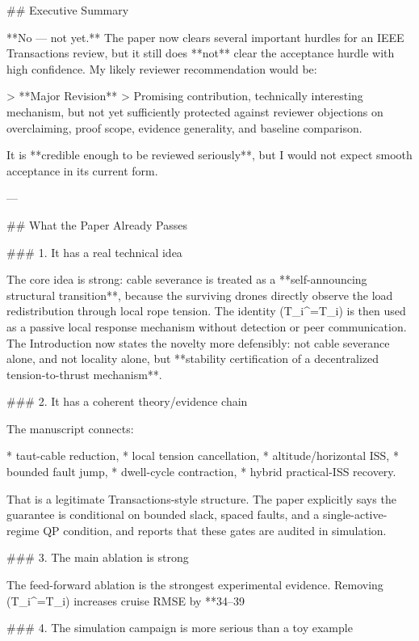 ## Executive Summary

**No — not yet.** The paper now clears several important hurdles for an IEEE Transactions review, but it still does **not** clear the acceptance hurdle with high confidence. My likely reviewer recommendation would be:

> **Major Revision**
> Promising contribution, technically interesting mechanism, but not yet sufficiently protected against reviewer objections on overclaiming, proof scope, evidence generality, and baseline comparison.

It is **credible enough to be reviewed seriously**, but I would not expect smooth acceptance in its current form.

---

## What the Paper Already Passes

### 1. It has a real technical idea

The core idea is strong: cable severance is treated as a **self-announcing structural transition**, because the surviving drones directly observe the load redistribution through local rope tension. The identity (T_i^{}=T_i) is then used as a passive local response mechanism without detection or peer communication. The Introduction now states the novelty more defensibly: not cable severance alone, and not locality alone, but **stability certification of a decentralized tension-to-thrust mechanism**.

### 2. It has a coherent theory/evidence chain

The manuscript connects:

* taut-cable reduction,
* local tension cancellation,
* altitude/horizontal ISS,
* bounded fault jump,
* dwell-cycle contraction,
* hybrid practical-ISS recovery.

That is a legitimate Transactions-style structure. The paper explicitly says the guarantee is conditional on bounded slack, spaced faults, and a single-active-regime QP condition, and reports that these gates are audited in simulation.

### 3. The main ablation is strong

The feed-forward ablation is the strongest experimental evidence. Removing (T_i^{}=T_i) increases cruise RMSE by **34–39%

### 4. The simulation campaign is more serious than a toy example

